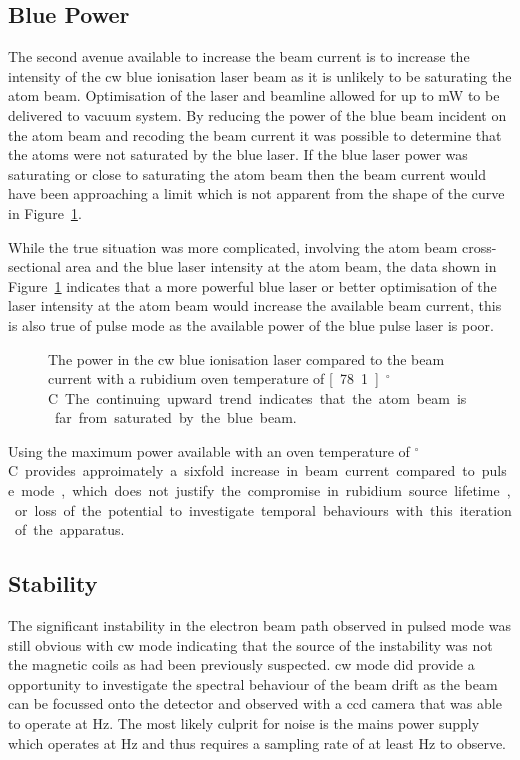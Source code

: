 \subsection{Blue Power}

The second avenue available to increase the beam current is to increase the intensity of the \gls{cw} blue ionisation laser beam as it is unlikely to be saturating the atom beam.
Optimisation of the laser and beamline allowed for up to \unit[280]{mW} to be delivered to vacuum system.
By reducing the power of the blue beam incident on the atom beam and recoding the beam current it was possible to determine that the atoms were not saturated by the blue laser.
If the blue laser power was saturating or close to saturating the atom beam then the beam current would have been approaching a limit which is not apparent from the shape of the curve in Figure~\ref{figure:blue_power}.

While the true situation was more complicated, involving the atom beam cross-sectional area and the blue laser intensity at the atom beam, the data shown in Figure~\ref{figure:blue_power} indicates that a more powerful blue laser or better optimisation of the laser intensity at the atom beam would increase the available beam current, this is also true of pulse mode as the available power of the blue pulse laser is poor.

\begin{figure}
    \center
    
    \caption{The power in the \gls{cw} blue ionisation laser compared to the beam current with a rubidium oven temperature of \unit[78.1]{$^\circ$C}.
    The continuing upward trend indicates that the atom beam is far from saturated by the blue beam.}
    \label{figure:blue_power}
\end{figure}

Using the maximum power available with an oven temperature of \unit[200]{$^\circ$C} provides approimately a sixfold increase in beam current compared to pulse mode, which does not justify the compromise in rubidium source lifetime, or loss of the potential to investigate temporal behaviours with this iteration of the apparatus.

\subsection{Stability}\label{section:stability}

The significant instability in the electron beam path observed in pulsed mode was still obvious with \gls{cw} mode indicating that the source of the instability was not the magnetic coils as had been previously suspected.
\Gls{cw} mode did provide a opportunity to investigate the spectral behaviour of the beam drift as the beam can be focussed onto the detector and observed with a \gls{ccd} camera that was able to operate at \unit[240]{Hz}.
The most likely culprit for noise is the mains power supply which operates at \unit[50]{Hz} and thus requires a sampling rate of at least \unit[100]{Hz} to observe.


